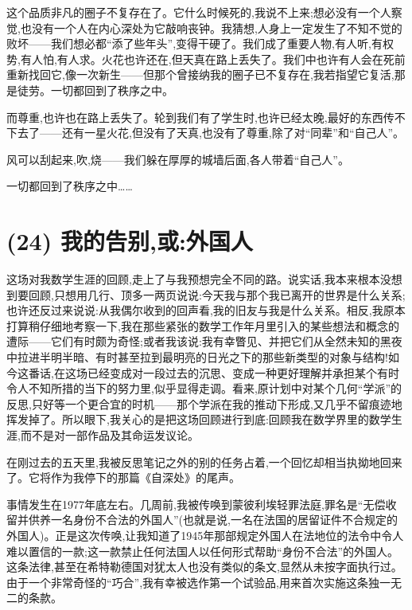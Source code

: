 这个品质非凡的圈子不复存在了。它什么时候死的,我说不上来;想必没有一个人察觉,也没有一个人在内心深处为它敲响丧钟。我猜想,人身上一定发生了不知不觉的败坏——我们想必都“添了些年头”,变得干硬了。我们成了重要人物,有人听,有权势,有人怕,有人求。火花也许还在,但天真在路上丢失了。我们中也许有人会在死前重新找回它,像一次新生——但那个曾接纳我的圈子已不复存在,我若指望它复活,那是徒劳。一切都回到了秩序之中。

而尊重,也许也在路上丢失了。轮到我们有了学生时,也许已经太晚,最好的东西传不下去了——还有一星火花,但没有了天真,也没有了尊重,除了对“同辈”和“自己人”。

风可以刮起来,吹,烧——我们躲在厚厚的城墙后面,各人带着“自己人”。

一切都回到了秩序之中……

\section{(24) 我的告别,或:外国人}

这场对我数学生涯的回顾,走上了与我预想完全不同的路。说实话,我本来根本没想到要回顾,只想用几行、顶多一两页说说:今天我与那个我已离开的世界是什么关系;也许还反过来说说:从我偶尔收到的回声看,我的旧友与我是什么关系。相反,我原本打算稍仔细地考察一下,我在那些紧张的数学工作年月里引入的某些想法和概念的遭际——它们有时颇为奇怪;或者我该说:我有幸瞥见、并把它们从全然未知的黑夜中拉进半明半暗、有时甚至拉到最明亮的日光之下的那些新类型的对象与结构!如今这番话,在这场已经变成对一段过去的沉思、变成一种更好理解并承担某个有时令人不知所措的当下的努力里,似乎显得走调。看来,原计划中对某个几何“学派”的反思,只好等一个更合宜的时机——那个学派在我的推动下形成,又几乎不留痕迹地挥发掉了。所以眼下,我关心的是把这场回顾进行到底:回顾我在数学界里的数学生涯,而不是对一部作品及其命运发议论。

在刚过去的五天里,我被反思笔记之外的别的任务占着,一个回忆却相当执拗地回来了。它将作为我停下的那篇《自深处》的尾声。

事情发生在1977年底左右。几周前,我被传唤到蒙彼利埃轻罪法庭,罪名是“无偿收留并供养一名身份不合法的外国人”(也就是说,一名在法国的居留证件不合规定的外国人)。正是这次传唤,让我知道了1945年那部规定外国人在法地位的法令中令人难以置信的一款;这一款禁止任何法国人以任何形式帮助“身份不合法”的外国人。这条法律,甚至在希特勒德国对犹太人也没有类似的条文,显然从未按字面执行过。由于一个非常奇怪的“巧合”,我有幸被选作第一个试验品,用来首次实施这条独一无二的条款。

